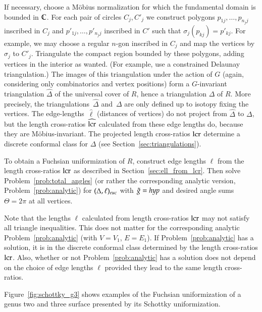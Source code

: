 \documentclass[Thesis]{subfiles}
\begin{document}
If necessary, choose a M{\"o}bius normalization for which the
fundamental domain is bounded in $\mathbb C$. For each pair of circles
$C_{j}, C'_{j}$ we construct polygons $p_{1j},\ldots,p_{n_{j}j}$
inscribed in $C_{j}$ and $p'_{1j},\ldots,p'_{n_{j}j}$ inscribed in
$C'$ such that $\sigma_{j}(p_{kj})=p'_{kj}$. For example, we may
choose a regular $n$-gon inscribed in $C_{j}$ and map the vertices by
$\sigma_{j}$ to $C'_{j}$.  Triangulate the compact region bounded by
these polygons, adding vertices in the interior as wanted. (For
example, use a constrained Delaunay triangulation.) The images of this
triangulation under the action of $G$ (again, considering only
combinatorics and vertex positions) form a $G$-invariant triangulation
$\hat\Delta$ of the universal cover of $R$, hence a triangulation
$\Delta$ of $R$. More precisely, the triangulations~$\hat\Delta$
and~$\Delta$ are only defined up to isotopy fixing the vertices. The
edge-lengths~$\hat\ell$ (distances of vertices) do not project from
$\hat\Delta$ to $\Delta$, but the length cross-ratios $\widehat{\operatorname{lcr}}$
calculated from these edge lengths do, because they are M{\"o}bius-invariant. 
The projected length cross-ratios $\operatorname{lcr}$ determine a
discrete conformal class for $\Delta$ (see
Section~\ref{sec:triangulations}).

To obtain a Fuchsian uniformization of $R$, construct edge lengths
$\ell$ from the length cross-ratios $\operatorname{lcr}$ as described in
Section~\ref{sec:ell_from_lcr}. Then solve
Problem~\ref{prob:total_angles} (or rather the corresponding analytic
version, Problem~\ref{prob:analytic}) for $(\Delta,\ell)_{\euc}$ with
$\tilde{g}=\mathit{hyp}$ and desired angle sums $\Theta=2\pi$ at all vertices.

Note that the lengths $\ell$ calculated from length cross-ratios
$\operatorname{lcr}$ may not satisfy all triangle inequalities. This does not matter
for the corresponding analytic Problem~\ref{prob:analytic} (with
$V=V_{1}$, $E=E_{1}$). If Problem~\ref{prob:analytic} has a solution,
it is in the discrete conformal class determined by the length
cross-ratios $\operatorname{lcr}$. Also, whether or not Problem~\ref{prob:analytic}
has a solution does not depend on the choice of edge lengths $\ell$
provided they lead to the same length cross-ratios.

Figure~\ref{fig:schottky_g3} shows examples of the Fuchsian
uniformization of a genus two and three surface presented by its Schottky
uniformization. 
\end{document}
